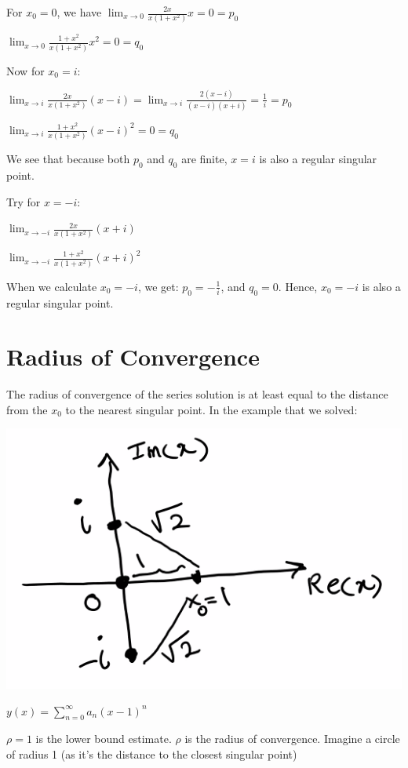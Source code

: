 \documentclass{article}
\begin{document}
For $x_0 = 0$, we have $\lim_{x \to 0} \frac{2x}{x(1+x^2)} x = 0 = p_0$

$\lim_{x \to 0} \frac{1+x^2}{x(1+x^2)} x^2 = 0 = q_0$

\hfill \break 

Now for $x_0 = i$:

$\lim_{x \to i} \frac{2x}{x (1+x^2)} (x - i) = \lim_{x \to i} \frac{2(x-i)}{(x-i)(x+i)} = \frac{1}{i} = p_0$

$\lim_{x \to i} \frac{1+x^2}{x(1+x^2)} (x-i)^2 = 0 = q_0$

We see that because both $p_0$ and $q_0$ are finite, $x = i$ is also a regular singular point. 

Try for $x = -i$:

\begin{center}
$\lim_{x \to -i} \frac{2x}{x (1+x^2)} (x+i)$

$\lim_{x \to -i} \frac{1+x^2}{x(1+x^2)} (x+i)^2$
\end{center}


When we calculate $x_0 = -i$, we get: $p_0 = -\frac{1}{i}$, and $q_0 = 0$. Hence, $x_0 = -i$ is also a regular singular point. 

\section{Radius of Convergence}

The radius of convergence of the series solution is at least equal to the distance from the $x_0$ to the nearest singular point. In the example that we solved:

\includegraphics[width = 0.7 \textwidth]{image2.png}

$y(x) = \sum_{n = 0}^{\infty} a_n (x-1)^n$

$\rho = 1$ is the lower bound estimate. $\rho$ is the radius of convergence. Imagine a circle of radius 1 (as it's the distance to the closest singular point)
\end{document}
